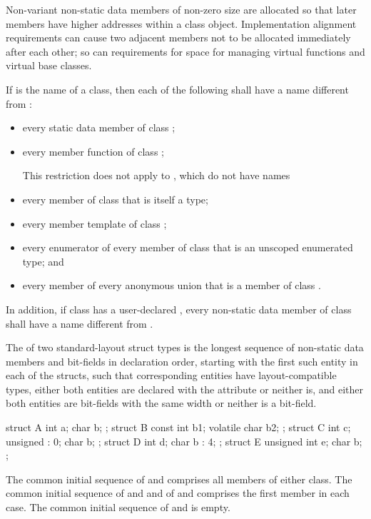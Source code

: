 \pnum
\begin{note}
%
Non-variant non-static data members of
non-zero size
are allocated so that later
members have higher addresses within a class object.
Implementation alignment requirements can cause two adjacent members
not to be allocated immediately after each other; so can requirements
for space for managing virtual functions and
virtual base classes.
\end{note}

\pnum
If  is the name of a class, then each of the following shall
have a name different from :
\begin{itemize}
\item every static data member of class ;

\item every member function of class ;
\begin{note}
This restriction does not apply to ,
which do not have names
\end{note}%

\item every member of class  that is itself a type;

\item every member template of class ;

\item every enumerator of every member of class  that is an
unscoped enumerated type; and

\item every member of every anonymous union that is a member of class
.
\end{itemize}

\pnum
In addition, if class  has a user-declared
, every non-static data member of class
 shall have a name different from .

\pnum
The  of two standard-layout struct
types is the longest sequence of non-static data
members and bit-fields in declaration order, starting with the first
such entity in each of the structs, such that corresponding entities
have layout-compatible types,
either both entities are declared with
the  attribute
or neither is,
and either both entities are bit-fields with the same width
or neither is a bit-field.
\begin{example}
\begin{codeblock}
struct A { int a; char b; };
struct B { const int b1; volatile char b2; };
struct C { int c; unsigned : 0; char b; };
struct D { int d; char b : 4; };
struct E { unsigned int e; char b; };
\end{codeblock}
The common initial sequence of  and  comprises all members
of either class. The common initial sequence of  and  and
of  and  comprises the first member in each case.
The common initial sequence of  and  is empty.
\end{example}

